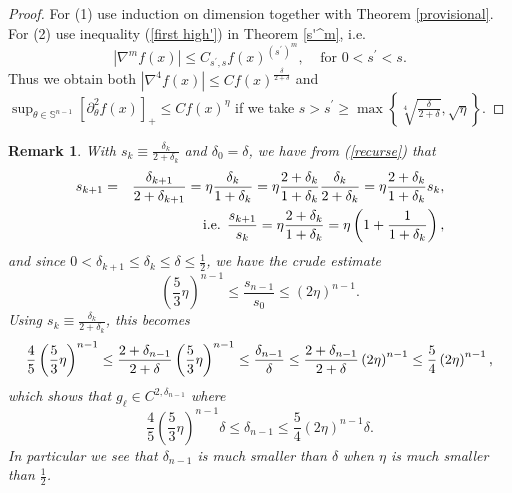 \documentclass{amsart}
\theoremstyle{plain}
\newtheorem{remark}[theorem]{Remark}
\numberwithin{equation}{section}
\begin{document}
\begin{proof}
For (1) use induction on dimension together with Theorem \ref{provisional}.
For (2) use inequality (\ref{first high'}) in Theorem \ref{s'^m}, i.e.%
\begin{equation*}
\left\vert \nabla ^{m}f\left( x\right) \right\vert \leq C_{s^{\prime
},s}f\left( x\right) ^{\left( s^{\prime }\right) ^{m}},\ \ \ \ \ \text{for }%
0<s^{\prime }<s.
\end{equation*}%
Thus we obtain both $\left\vert \nabla ^{4}f\left( x\right) \right\vert \leq
Cf\left( x\right) ^{\frac{\delta }{2+\delta }}$ and $\sup_{\theta \in 
\mathbb{S}^{n-1}}\left[ \partial _{\theta }^{2}f\left( x\right) \right]
_{+}\leq Cf\left( x\right) ^{\eta }$ if we take $s>s^{\prime }\geq \max
\left\{ \sqrt[4]{\frac{\delta }{2+\delta }},\sqrt{\eta }\right\} $.
\end{proof}

\begin{remark}
With $s_{k}\equiv \frac{\delta _{k}}{2+\delta _{k}}$ and $\delta _{0}=\delta 
$, we have from (\ref{recurse}) that%
\begin{eqnarray*}
s_{k+1} &=&\frac{\delta _{k+1}}{2+\delta _{k+1}}=\eta \frac{\delta _{k}}{%
1+\delta _{k}}=\eta \frac{2+\delta _{k}}{1+\delta _{k}}\frac{\delta _{k}}{%
2+\delta _{k}}=\eta \frac{2+\delta _{k}}{1+\delta _{k}}s_{k}, \\
&&\text{i.e. }\frac{s_{k+1}}{s_{k}}=\eta \frac{2+\delta _{k}}{1+\delta _{k}}%
=\eta \left( 1+\frac{1}{1+\delta _{k}}\right) \text{,}
\end{eqnarray*}%
and since $0<\delta _{k+1}\leq \delta _{k}\leq \delta \leq \frac{1}{2}$, we
have the crude estimate%
\begin{equation*}
\left( \frac{5}{3}\eta \right) ^{n-1}\leq \frac{s_{n-1}}{s_{0}}\leq \left(
2\eta \right) ^{n-1}.
\end{equation*}%
Using $s_{k}\equiv \frac{\delta _{k}}{2+\delta _{k}}$, this becomes%
\begin{equation*}
\frac{4}{5}\left( \frac{5}{3}\eta \right) ^{n-1}\leq \frac{2+\delta _{n-1}}{%
2+\delta }\left( \frac{5}{3}\eta \right) ^{n-1}\leq \frac{\delta _{n-1}}{%
\delta }\leq \frac{2+\delta _{n-1}}{2+\delta }\left( 2\eta \right)
^{n-1}\leq \frac{5}{4}\left( 2\eta \right) ^{n-1},
\end{equation*}%
which shows that $g_{\ell }\in C^{2,\delta _{n-1}}$ where 
\begin{equation*}
\frac{4}{5}\left( \frac{5}{3}\eta \right) ^{n-1}\delta \leq \delta
_{n-1}\leq \frac{5}{4}\left( 2\eta \right) ^{n-1}\delta .
\end{equation*}%
In particular we see that $\delta _{n-1}$ is much smaller than $\delta $
when $\eta $ is much smaller than $\frac{1}{2}$.
\end{remark}
\end{document}
